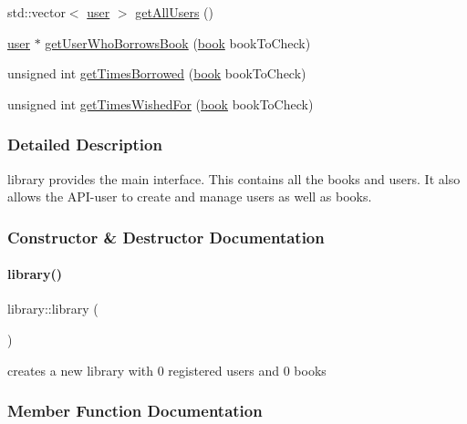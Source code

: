 \begin{DoxyCompactItemize}
\item 
std\+::vector$<$ \hyperlink{classuser}{user} $>$ \hyperlink{classlibrary_aa128a867b3ac05e2801d7c3dd5691038}{get\+All\+Users} ()
\item 
\hyperlink{classuser}{user} $\ast$ \hyperlink{classlibrary_a6c3bdf1f2614b6b7459ebcc898f8636f}{get\+User\+Who\+Borrows\+Book} (\hyperlink{classbook}{book} book\+To\+Check)
\item 
unsigned int \hyperlink{classlibrary_a297c4813872bbba3f8088a4acc3f7b6d}{get\+Times\+Borrowed} (\hyperlink{classbook}{book} book\+To\+Check)
\item 
unsigned int \hyperlink{classlibrary_ae6b0c037908e328dcf3a9dfb946ed5f2}{get\+Times\+Wished\+For} (\hyperlink{classbook}{book} book\+To\+Check)
\end{DoxyCompactItemize}


\subsubsection{Detailed Description}
library provides the main interface. This contains all the books and users. It also allows the A\+P\+I-\/user to create and manage users as well as books. 

\subsubsection{Constructor \& Destructor Documentation}
\mbox{\label{classlibrary_a2137d3edeea39929e8f111432c85bc79}} 
\paragraph{\texorpdfstring{library()}{library()}}
{\footnotesize\ttfamily library\+::library (\begin{DoxyParamCaption}{ }\end{DoxyParamCaption})}

creates a new library with 0 registered users and 0 books 

\subsubsection{Member Function Documentation}
\mbox{\label{classlibrary_abe4fe5bfd3355630fedbefd7828ee03e}} 

